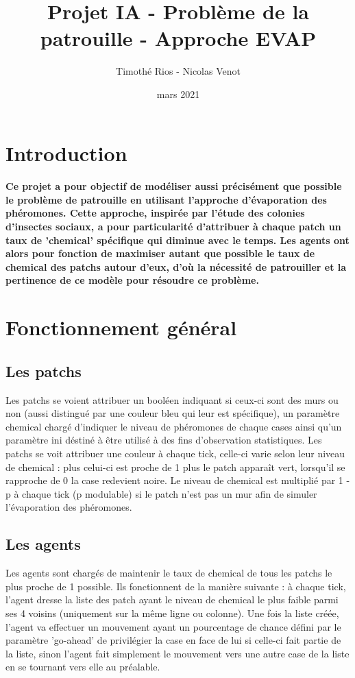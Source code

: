 \documentclass{article}
\title{Projet IA - Probl\`eme de la patrouille - Approche EVAP}
\author{Timoth\'e Rios - Nicolas Venot}
\date{mars 2021}
\begin{document}
\maketitle
\newpage
\tableofcontents
\newpage
\setlength{\parindent}{0pt}
\section*{Introduction}
\paragraph{Ce projet a pour objectif de mod\'eliser aussi pr\'ecis\'ement que possible le probl\`eme de patrouille en utilisant l'approche d'\'evaporation des ph\'eromones.
Cette approche, inspir\'ee par l'\'etude des colonies d'insectes sociaux, a pour particularit\'e d'attribuer \`a chaque patch un taux de 'chemical' sp\'ecifique qui diminue avec le temps.
Les agents ont alors pour fonction de maximiser autant que possible le taux de chemical des patchs autour d'eux, d'o\`u la n\'ecessit\'e de patrouiller et la pertinence de ce mod\`ele pour r\'esoudre ce probl\`eme.}
\section{Fonctionnement g\'en\'eral}
    \subsection{Les patchs}
Les patchs se voient attribuer un bool\'een indiquant si ceux-ci sont des murs ou non (aussi distingu\'e par une couleur bleu qui leur est sp\'ecifique), un param\`etre chemical charg\'e d'indiquer le niveau de ph\'eromones de chaque cases ainsi qu'un param\`etre ini d\'estin\'e \`a \^etre utilis\'e \`a des fins d'observation statistiques.
Les patchs se voit attribuer une couleur \`a chaque tick, celle-ci varie selon leur niveau de chemical :
plus celui-ci est proche de 1 plus le patch appara\^it vert, lorsqu'il se rapproche de 0 la case redevient noire. Le niveau de chemical est multipli\'e par 1 - p \`a chaque tick (p modulable) si le patch n'est pas un mur afin de simuler l'\'evaporation des ph\'eromones.
      
    \subsection{Les agents}
Les agents sont charg\'es de maintenir le taux de chemical de tous les patchs le plus proche de 1 possible.
Ils fonctionnent de la mani\`ere suivante : \`a chaque tick, l'agent dresse la liste des patch ayant le niveau de chemical le plus faible parmi ses 4 voisins (uniquement sur la m\^eme ligne ou colonne). Une fois la liste cr\'e\'ee, l'agent va effectuer un mouvement ayant un pourcentage de chance d\'efini par le param\`etre 'go-ahead' de privil\'egier la case en face de lui si celle-ci fait partie de la liste, sinon l'agent fait simplement le mouvement vers une autre case de la liste en se tournant vers elle au pr\'ealable.
\end{document}

